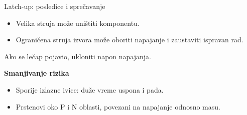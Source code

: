 \begin{frame}[label=09_2-s052]{Latch-up: posledice i sprečavanje}
\begin{itemize}
\item Velika struja može uništiti komponentu.
\item Ograničena struja izvora može oboriti napajanje i zaustaviti ispravan rad.
\end{itemize}
\vspace{3mm}\alert{Ako se lečap pojavio, ukloniti napon napajanja.}
\par\vspace{3mm}
\textbf{Smanjivanje rizika}
\begin{itemize}
\item Sporije izlazne ivice: duže vreme uspona i pada.
\item Prstenovi oko P i N oblasti, povezani na napajanje odnosno masu.
\end{itemize}
\end{frame}
